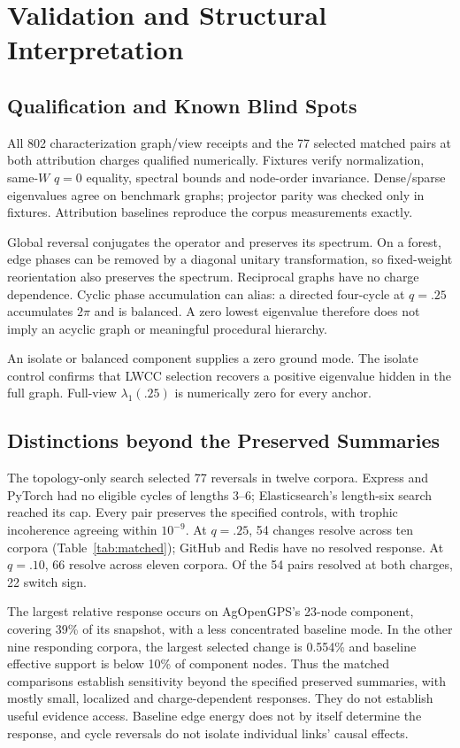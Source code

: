 \section{Validation and Structural Interpretation}
\label{sec:validation}
\subsection{Qualification and Known Blind Spots}
All 802 characterization graph/view receipts and the 77 selected matched pairs
at both attribution charges qualified numerically.
Fixtures verify normalization, same-$W$ $q=0$ equality, spectral bounds and
node-order invariance. Dense/sparse eigenvalues agree on benchmark graphs;
projector parity was checked only in fixtures. Attribution baselines reproduce
the corpus measurements exactly.

Global reversal conjugates the operator and preserves its spectrum. On a forest,
edge phases can be removed by a diagonal unitary transformation, so fixed-weight
reorientation also preserves the spectrum. Reciprocal graphs have no charge
dependence. Cyclic phase accumulation can alias: a directed four-cycle at
$q=.25$ accumulates $2\pi$ and is balanced. A zero lowest eigenvalue therefore
does not imply an acyclic graph or meaningful procedural hierarchy.

An isolate or balanced component supplies a zero ground mode. The isolate
control confirms that LWCC selection recovers a positive eigenvalue hidden in
the full graph. Full-view $\lambda_1(.25)$ is numerically zero for every anchor.

\subsection{Distinctions beyond the Preserved Summaries}
The topology-only search selected 77 reversals in twelve corpora. Express and
PyTorch had no eligible cycles of lengths 3--6; Elasticsearch's length-six search
reached its cap. Every pair preserves the specified controls, with trophic
incoherence agreeing within $10^{-9}$. At $q=.25$, 54 changes resolve across ten
corpora (Table~\ref{tab:matched}); GitHub and Redis have no resolved response.
At $q=.10$, 66 resolve across eleven corpora. Of the 54 pairs resolved at both
charges, 22 switch sign.


The largest relative response occurs on AgOpenGPS's 23-node component, covering
39\% of its snapshot, with a less concentrated baseline mode. In the other nine
responding corpora, the largest selected change is 0.554\% and baseline effective
support is below 10\% of component nodes. Thus the matched comparisons establish
sensitivity beyond the specified preserved summaries, with mostly small,
localized and charge-dependent responses. They do not establish useful evidence
access. Baseline edge energy does not by itself determine the response, and
cycle reversals do not isolate individual links' causal effects.
